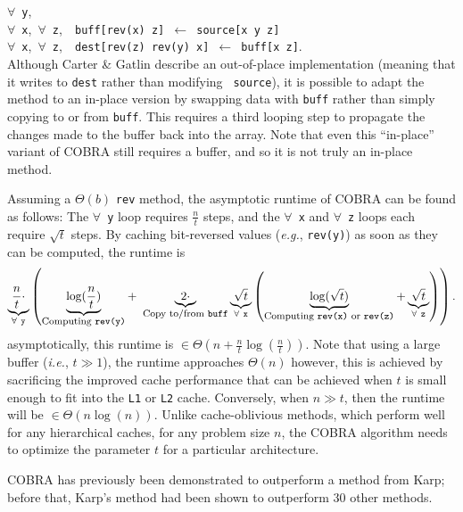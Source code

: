 ﻿\documentclass[10pt]{article}
\begin{document}
\noindent $\forall$~{\tt y},\\
\mbox{} \quad $\forall$~{\tt x},~$\forall$~{\tt z},~{\tt
  buff[rev(x)~z]~$\gets$~source[x~y~z]}\\
\mbox{} \quad $\forall$~{\tt x},~$\forall$~{\tt z},~{\tt
  dest[rev(z)~rev(y)~x]~$\gets$~buff[x~z]}.\\

Although Carter \& Gatlin describe an out-of-place implementation
(meaning that it writes to {\tt dest} rather than modifying {\tt
  source}), it is possible to adapt the method to an in-place version
by swapping data with {\tt buff} rather than simply copying to or from
{\tt buff}. This requires a third looping step to propagate the
changes made to the buffer back into the array. Note that even this
``in-place'' variant of COBRA still requires a buffer, and so it is
not truly an in-place method.

Assuming a $\Theta(b)$ {\tt rev} method, the asymptotic runtime of
COBRA can be found as follows: The $\forall$~{\tt y} loop requires
$\frac{n}{t}$ steps, and the $\forall$~{\tt x} and $\forall$~{\tt z}
loops each require $\sqrt{t}$ steps. By caching bit-reversed values
(\emph{e.g.}, {\tt rev(y)}) as soon as they can be computed, the
runtime is
\[
\underbrace{\frac{n}{t} \cdot }_{\forall~{\tt y}} \left( \underbrace{ \log(\frac{n}{t}) }_{\mbox{\footnotesize Computing {\tt rev(y)}}} +~ \underbrace{2 \cdot}_{\mbox{\footnotesize Copy to/from {\tt buff}}} \underbrace{\sqrt{t}}_{\forall~{\tt x}} \left(
\underbrace{\log(\sqrt{t})}_{\mbox{\footnotesize Computing {\tt rev(x)} or {\tt rev(z)}}} + \underbrace{\sqrt{t}}_{\forall~{\tt z}} \right) \right).
\] asymptotically, this runtime is $\in \Theta\left( n + \frac{n}{t}
\log(\frac{n}{t}) \right)$. Note that using a large buffer
(\emph{i.e.}, $t \gg 1$), the runtime approaches $\Theta\left( n
\right)$ however, this is achieved by sacrificing the improved cache
performance that can be achieved when $t$ is small enough to fit into
the {\tt L1} or {\tt L2} cache. Conversely, when $n \gg t$, then the
runtime will be $\in \Theta(n \log(n))$. Unlike cache-oblivious
methods, which perform well for any hierarchical caches, for any
problem size $n$, the COBRA algorithm needs to optimize the parameter
$t$ for a particular architecture.

COBRA has previously been demonstrated to outperform a method from
Karp\cite{carter:towards}; before that, Karp's method had been shown
to outperform 30 other methods\cite{karp:bit}.\newline
\end{document}

